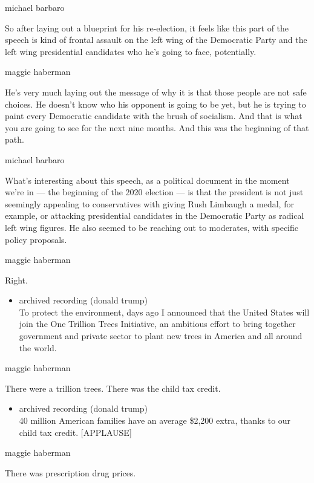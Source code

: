 michael barbaro

So after laying out a blueprint for his re-election, it feels like this
part of the speech is kind of frontal assault on the left wing of the
Democratic Party and the left wing presidential candidates who he's
going to face, potentially.

maggie haberman

He's very much laying out the message of why it is that those people are
not safe choices. He doesn't know who his opponent is going to be yet,
but he is trying to paint every Democratic candidate with the brush of
socialism. And that is what you are going to see for the next nine
months. And this was the beginning of that path.

michael barbaro

What's interesting about this speech, as a political document in the
moment we're in --- the beginning of the 2020 election --- is that the
president is not just seemingly appealing to conservatives with giving
Rush Limbaugh a medal, for example, or attacking presidential candidates
in the Democratic Party as radical left wing figures. He also seemed to
be reaching out to moderates, with specific policy proposals.

maggie haberman

Right.

\begin{itemize}
\tightlist
\item
  archived recording (donald trump)\\
  To protect the environment, days ago I announced that the United
  States will join the One Trillion Trees Initiative, an ambitious
  effort to bring together government and private sector to plant new
  trees in America and all around the world.
\end{itemize}

maggie haberman

There were a trillion trees. There was the child tax credit.

\begin{itemize}
\tightlist
\item
  archived recording (donald trump)\\
  40 million American families have an average \$2,200 extra, thanks to
  our child tax credit. {[}APPLAUSE{]}
\end{itemize}

maggie haberman

There was prescription drug prices.

